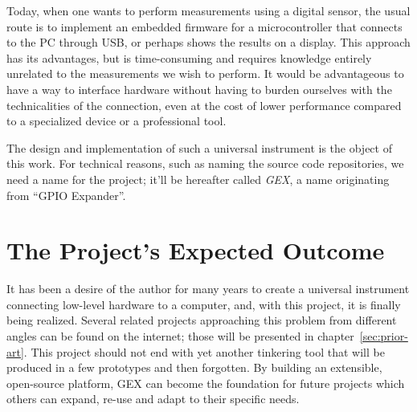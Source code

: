 Today, when one wants to perform measurements using a digital sensor, the usual route is to implement an embedded firmware for a microcontroller that connects to the \gls{PC} through \gls{USB}, or perhaps shows the results on a display. This approach has its advantages, but is time-consuming and requires knowledge entirely unrelated to the measurements we wish to perform. It would be advantageous to have a way to interface hardware without having to burden ourselves with the technicalities of the connection, even at the cost of lower performance compared to a specialized device or a professional tool. 

The design and implementation of such a universal instrument is the object of this work. For technical reasons, such as naming the source code repositories, we need a name for the project; it'll be hereafter called \textit{GEX}, a name originating from ``GPIO Expander''.

\section{The Project's Expected Outcome}\label{sec:expected-outcome}

It has been a desire of the author for many years to create a universal instrument connecting low-level hardware to a computer, and, with this project, it is finally being realized. Several related projects approaching this problem from different angles can be found on the internet; those will be presented in chapter~\ref{sec:prior-art}. This project should not end with yet another tinkering tool that will be produced in a few prototypes and then forgotten. By building an extensible, open-source platform, GEX can become the foundation for future projects which others can expand, re-use and adapt to their specific needs.

